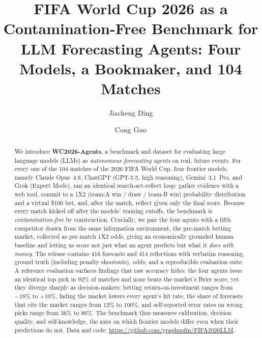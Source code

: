 \documentclass[sigconf,nonacm]{acmart}
\begin{document}
\title{FIFA World Cup 2026 as a Contamination-Free Benchmark for LLM
Forecasting Agents: Four Models, a Bookmaker, and 104 Matches}

\author{Jiacheng Ding}

\author{Cong Guo}
\authornotemark[1]

\renewcommand{\shortauthors}{Ding and Guo}

\begin{abstract}
We introduce \textbf{WC2026-Agents}, a benchmark and dataset for evaluating
large language models (LLMs) as \emph{autonomous forecasting agents} on real,
future events. For every one of the 104 matches of the 2026 FIFA World Cup, four
frontier models, namely Claude Opus~4.8, ChatGPT (GPT-5.5, high reasoning),
Gemini~3.1~Pro, and Grok (Expert Mode), ran an identical search-act-reflect
loop: gather evidence with a web tool, commit to a 1X2 (team-A win / draw /
team-B win) probability distribution and
a virtual \$100 bet, and, after the match, reflect given only the final score.
Because every match kicked off after the models' training cutoffs, the benchmark
is \emph{contamination-free} by construction. Crucially, we pair the four agents
with a fifth competitor drawn from the same information environment, the
pre-match betting market, collected as per-match 1X2 odds, giving an
economically grounded human baseline and letting us score not just what an agent
predicts but what it \emph{does with money}. The release contains 416 forecasts
and 414 reflections with verbatim reasoning, ground truth (including penalty
shootouts), odds, and a reproducible evaluation suite. A reference evaluation
surfaces findings that raw accuracy hides: the four agents issue an identical
top pick in 92\% of matches and none beats the market's Brier score, yet they
diverge sharply as decision-makers: betting return-on-investment ranges from
$-18\%$ to $+10\%$, fading the market lowers every agent's hit rate, the share of
forecasts that cite the market ranges from 12\% to 100\%, and self-reported
error rates on wrong picks range from 36\% to 86\%. The benchmark thus measures
calibration, decision quality, and self-knowledge, the axes on which frontier
models differ even when their predictions do not. Data and code:
\url{https://github.com/graphuofm/FIFA2026LLM}.
\end{abstract}
\end{document}
